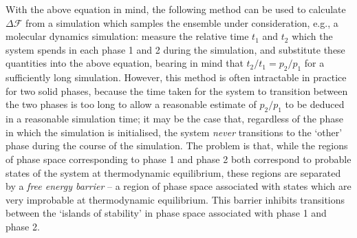 \documentclass{report}
\begin{document}
With the above equation in mind, the following method can be used to calculate $\Delta\mathcal{F}$ from a simulation which samples the ensemble under 
consideration, e.g., a molecular dynamics simulation: measure the relative time $t_1$ and $t_2$ which the system spends in each phase 1 and 2 during the
simulation, and substitute these quantities into the above equation, bearing in mind that $t_2/t_1=p_2/p_1$ for a sufficiently long simulation.
However, this method is often intractable in practice for two solid phases, 
because the time taken for the system to transition between the two phases is too long to allow a reasonable estimate of $p_2/p_1$ to be deduced 
in a reasonable simulation time; it may be the case that, regardless of the phase in which the simulation is initialised, the system \emph{never} 
transitions to the `other' phase during the course of the simulation.
The problem is that, while the regions of phase space corresponding to phase 1 and phase 2 both correspond to probable states of the system
at thermodynamic equilibrium, these regions are separated by a \emph{free energy barrier} -- a region of phase space associated
with states which are very improbable at thermodynamic equilibrium. This barrier inhibits transitions between the `islands of
stability' in phase space associated with phase 1 and phase 2.
\end{document}
